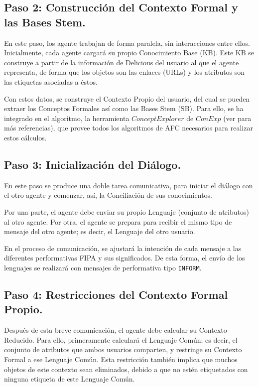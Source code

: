 \subsection{Paso 2: Construcción del Contexto Formal y las Bases Stem.}

En este paso, los agente trabajan de forma paralela, sin interacciones entre ellos. Inicialmente, cada agente cargará su propio Conocimiento Base (KB). Este KB se construye a partir de la información de Delicious del usuario al que el agente representa, de forma que los objetos son las enlaces (URLs) y los atributos son las etiquetas asociadas a éstos.

Con estos datos, se construye el Contexto Propio del usuario, del cual se pueden extraer los Conceptos Formales así como las Bases Stem (SB). Para ello, se ha integrado en el algoritmo, la herramienta $Concept Explorer$ de $ConExp$ (ver \cite{conexp} para más referencias), que provee todos los algoritmos de AFC necesarios para realizar estos cálculos.

\subsection{Paso 3: Inicialización del Diálogo.}

En este paso se produce una doble tarea comunicativa, para iniciar el diálogo con el otro agente y comenzar, así, la Conciliación de sus conocimientos.

Por una parte, el agente debe enviar su propio Lenguaje (conjunto de atributos) al otro agente. Por otra, el agente se prepara para recibir el mismo tipo de mensaje del otro agente; es decir, el Lenguaje del otro usuario.

En el proceso de comunicación, se ajustará la intención de cada mensaje a las diferentes performativas FIPA y sus significados. De esta forma, el envío de los lenguajes se realizará con mensajes de performativa tipo {\tt INFORM}.

\subsection{Paso 4: Restricciones del Contexto Formal Propio.}

Después de esta breve comunicación, el agente debe calcular su Contexto Reducido. Para ello, primeramente calculará el Lenguaje Común; es decir, el conjunto de atributos que ambos usuarios comparten, y restringe su Contexto Formal a ese Lenguaje Común. Esta restricción también implica que muchos objetos de este contexto sean eliminados, debido a que no estén etiquetados con ninguna etiqueta de este Lenguaje Común.

